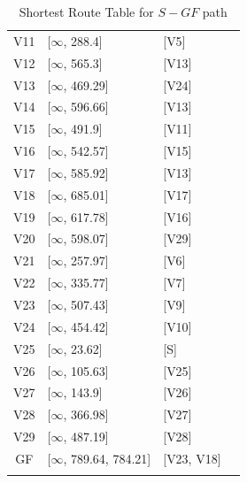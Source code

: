 \documentclass{article}
\begin{document}
\begin{longtable}[c]{@{}cll|l@{}}
		{\color[HTML]{FF0000} V11} & {[}\(\infty\), 288.4{]}          & {[}V5{]}       &  \\
		{\color[HTML]{FF0000} V12} & {[}\(\infty\), 565.3{]}          & {[}V13{]}      &  \\
		{\color[HTML]{FF0000} V13} & {[}\(\infty\), 469.29{]}         & {[}V24{]}      &  \\
		{\color[HTML]{FF0000} V14} & {[}\(\infty\), 596.66{]}         & {[}V13{]}      &  \\
		{\color[HTML]{FF0000} V15} & {[}\(\infty\), 491.9{]}          & {[}V11{]}      &  \\
		{\color[HTML]{FF0000} V16} & {[}\(\infty\), 542.57{]}         & {[}V15{]}      &  \\
		{\color[HTML]{FF0000} V17} & {[}\(\infty\), 585.92{]}         & {[}V13{]}      &  \\
		{\color[HTML]{FF0000} V18} & {[}\(\infty\), 685.01{]}         & {[}V17{]}      &  \\
		{\color[HTML]{FF0000} V19} & {[}\(\infty\), 617.78{]}         & {[}V16{]}      &  \\
		{\color[HTML]{FF0000} V20} & {[}\(\infty\), 598.07{]}         & {[}V29{]}      &  \\
		{\color[HTML]{FF0000} V21} & {[}\(\infty\), 257.97{]}         & {[}V6{]}       &  \\
		{\color[HTML]{FF0000} V22} & {[}\(\infty\), 335.77{]}         & {[}V7{]}       &  \\
		{\color[HTML]{FF0000} V23} & {[}\(\infty\), 507.43{]}         & {[}V9{]}       &  \\
		{\color[HTML]{FF0000} V24} & {[}\(\infty\), 454.42{]}         & {[}V10{]}      &  \\
		{\color[HTML]{FF0000} V25} & {[}\(\infty\), 23.62{]}          & {[}S{]}        &  \\
		{\color[HTML]{FF0000} V26} & {[}\(\infty\), 105.63{]}         & {[}V25{]}      &  \\
		{\color[HTML]{FF0000} V27} & {[}\(\infty\), 143.9{]}          & {[}V26{]}      &  \\
		{\color[HTML]{FF0000} V28} & {[}\(\infty\), 366.98{]}         & {[}V27{]}      &  \\
		{\color[HTML]{FF0000} V29} & {[}\(\infty\), 487.19{]}         & {[}V28{]}      &  \\
		{\color[HTML]{FF0000} GF}  & {[}\(\infty\), 789.64, 784.21{]} & {[}V23, V18{]} &  \\* \bottomrule
		\caption{Shortest Route Table for \(S-GF\) path}
		\label{shortest_sgf}\\
	\end{longtable}
	
	\ifx\graphTheoryPreambleLoaded
\end{document}
